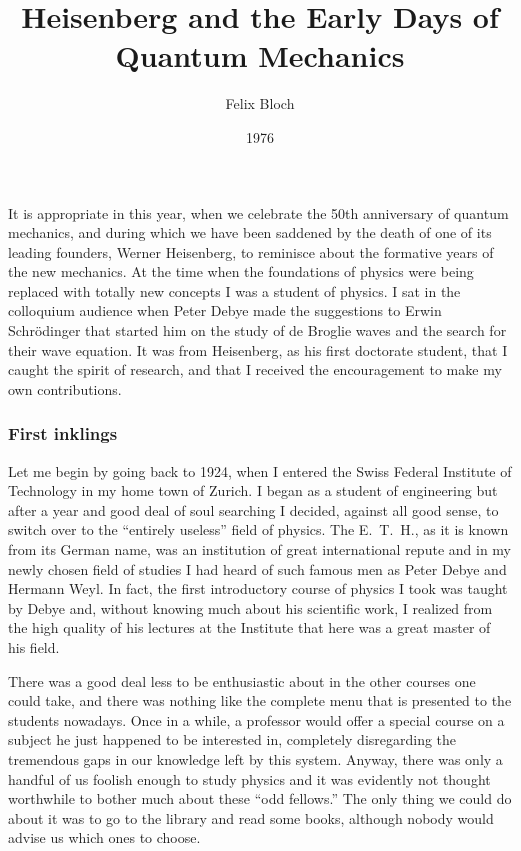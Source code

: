 \documentclass[12pt]{article}
\title{Heisenberg and the Early Days of Quantum Mechanics}
\author{Felix Bloch}
\date{1976}
\begin{document}
\maketitle

\noindent
It is appropriate in this year, when we celebrate the 50th anniversary of quantum mechanics, and during which we have been saddened by the death of one of its leading founders, Werner Heisenberg, to reminisce about the formative years of the new mechanics. At the time when the foundations of physics were being replaced with totally new concepts I was a student of physics. I sat in the colloquium audience when Peter Debye made the suggestions to Erwin Schr\"odinger that started him on the study of de Broglie waves and the search for their wave equation. It was from Heisenberg, as his first doctorate student, that I caught the spirit of research, and that I received the encouragement to make my own contributions.

\subsubsection*{First inklings}

Let me begin by going back to 1924, when I entered the Swiss Federal Institute of Technology in my home town of Zurich. I began as a student of engineering but after a year and good deal of soul searching I decided, against all good sense, to switch over to the ``entirely useless'' field of physics. The E.~T.~H., as it is known from its German name, was an institution of great international repute and in my newly chosen field of studies I
had heard of such famous men as Peter Debye and Hermann Weyl. In fact, the first introductory course of physics I took was taught by Debye and, without knowing much about his scientific work, I realized from the high quality of his lectures at the Institute that here was a great master of his field.

There was a good deal less to be enthusiastic about in the other courses one
could take, and there was nothing like the complete menu that is presented to the students nowadays. Once in a while, a professor would offer a special course on a subject he just happened to be interested in, completely disregarding the tremendous gaps in our knowledge left by this system. Anyway, there was only a handful of us foolish enough to study physics and it was evidently not thought worthwhile to bother much about these ``odd fellows.'' The only thing we could do about it was to go to the library and read some books, although nobody would advise us which ones to choose.
\end{document}
